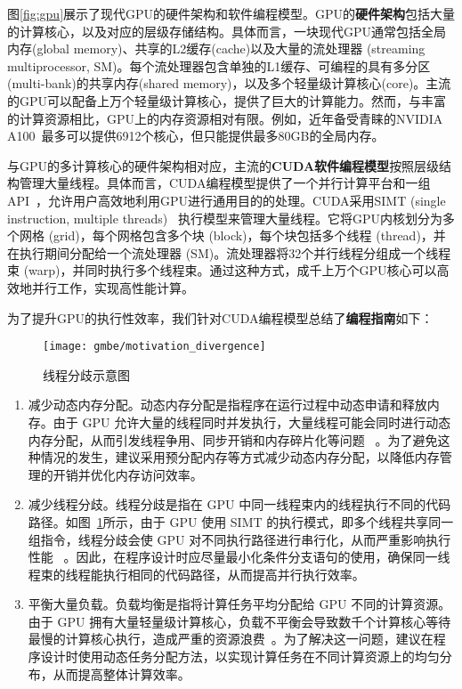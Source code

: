 图\ref{fig:gpu}展示了现代GPU的硬件架构和软件编程模型。GPU的\textbf{硬件架构}包括大量的计算核心，以及对应的层级存储结构。具体而言，一块现代GPU通常包括全局内存(global memory)、共享的L2缓存(cache)以及大量的流处理器 (streaming multiprocessor, SM)。每个流处理器包含单独的L1缓存、可编程的具有多分区(multi-bank)的共享内存(shared memory)，以及多个轻量级计算核心(core)。主流的GPU可以配备上万个轻量级计算核心，提供了巨大的计算能力。然而，与丰富的计算资源相比，GPU上的内存资源相对有限。例如，近年备受青睐的NVIDIA A100~\cite{NVIDIA-A100}最多可以提供6912个核心，但只能提供最多80GB的全局内存。

与GPU的多计算核心的硬件架构相对应，主流的\textbf{CUDA软件编程模型}按照层级结构管理大量线程。具体而言，CUDA编程模型提供了一个并行计算平台和一组API~\cite{CUDA-wiki,CUDAProgrammingGuide}，允许用户高效地利用GPU进行通用目的的处理。CUDA采用SIMT (single instruction, multiple threads)~\cite{SIMT-wiki} 执行模型来管理大量线程。它将GPU内核划分为多个网格 (grid)，每个网格包含多个块 (block)，每个块包括多个线程 (thread)，并在执行期间分配给一个流处理器 (SM)。流处理器将32个并行线程分组成一个线程束 (warp)，并同时执行多个线程束。通过这种方式，成千上万个GPU核心可以高效地并行工作，实现高性能计算。

为了提升GPU的执行性效率，我们针对CUDA编程模型总结了\textbf{编程指南}如下：

\begin{figure} [t]
  \center
    \vspace{0.05in}
		\texttt{[image: gmbe/motivation\_divergence]}
    \vspace{0.05in}
	\caption{线程分歧示意图}
	\label{fig:gmbe_motivation_divergence}
\end{figure}



\begin{enumerate}
  \item 减少动态内存分配。动态内存分配是指程序在运行过程中动态申请和释放内存。由于 GPU 允许大量的线程同时并发执行，大量线程可能会同时进行动态内存分配，从而引发线程争用、同步开销和内存碎片化等问题 ~\cite{DynamicMallocGpu21}。为了避免这种情况的发生，建议采用预分配内存等方式减少动态内存分配，以降低内存管理的开销并优化内存访问效率。
  
  \item 减少线程分歧。线程分歧是指在 GPU 中同一线程束内的线程执行不同的代码路径。如图~\ref{fig:gmbe_motivation_divergence}所示，由于 GPU 使用 SIMT 的执行模式，即多个线程共享同一组指令，线程分歧会使 GPU 对不同执行路径进行串行化，从而严重影响执行性能 ~\cite{CUDAProgrammingGuide}。因此，在程序设计时应尽量最小化条件分支语句的使用，确保同一线程束的线程能执行相同的代码路径，从而提高并行执行效率。

  \item 平衡大量负载。负载均衡是指将计算任务平均分配给 GPU 不同的计算资源。由于 GPU 拥有大量轻量级计算核心，负载不平衡会导致数千个计算核心等待最慢的计算核心执行，造成严重的资源浪费~\cite{CUDAProgrammingGuide}。为了解决这一问题，建议在程序设计时使用动态任务分配方法，以实现计算任务在不同计算资源上的均匀分布，从而提高整体计算效率。
\end{enumerate}


